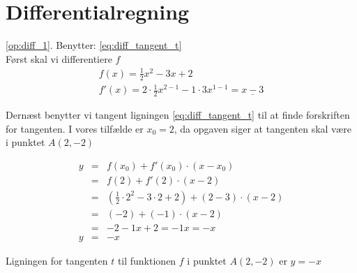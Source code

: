 \documentclass[11pt,a5paper,fleqn,leqno]{book}
\begin{document}
\section{Differentialregning}

\ref{op:diff_1}. Benytter: \eqref{eq:diff_tangent_t} \\
Først skal vi differentiere $f$
\begin{displaymath}\begin{array}{l}
f(x) = \frac{1}{2}x^2 - 3x + 2\\
f'(x) = 2 \cdot \frac{1}{2} x^{2-1} - 1 \cdot 3 x^{1-1} = \underline{x - 3}
\end{array}\end{displaymath}

Dernæst benytter vi tangent ligningen \eqref{eq:diff_tangent_t} til at finde forskriften for tangenten. I vores tilfælde er $x_0 = 2$, da opgaven siger at tangenten skal være i punktet $A(2,-2)$

\begin{displaymath}\begin{array}{rcl}
y & = & f(x_0)+f'(x_0) \cdot (x - x_0) \\
  & = & f(2)+f'(2) \cdot (x - 2) \\
  & = & (\frac{1}{2} \cdot 2^2 - 3 \cdot 2 + 2) + (2 - 3) \cdot (x - 2) \\
  & = & (-2) + (-1) \cdot (x - 2) \\
  & = & -2 - 1x + 2 = -1x = -x \\
y & = & -x
\end{array} \end{displaymath}

Ligningen for tangenten $t$ til funktionen $f$ i punktet $A(2,-2)$ er \underline{\underline{$y = -x$}}
\end{document}
